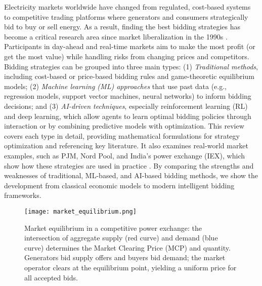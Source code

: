 \documentclass[conference]{IEEEtran}
\begin{document}
Electricity markets worldwide have changed from regulated, cost-based systems to competitive trading platforms where generators and consumers strategically bid to buy or sell energy. As a result, finding the best bidding strategies has become a critical research area since market liberalization in the 1990s \cite{David2000, David1993}. Participants in day-ahead and real-time markets aim to make the most profit (or get the most value) while handling risks from changing prices and competitors. Bidding strategies can be grouped into three main types: (1) \textit{Traditional methods}, including cost-based or price-based bidding rules and game-theoretic equilibrium models; (2) \textit{Machine learning (ML) approaches} that use past data (e.g., regression models, support vector machines, neural networks) to inform bidding decisions; and (3) \textit{AI-driven techniques}, especially reinforcement learning (RL) and deep learning, which allow agents to learn optimal bidding policies through interaction or by combining predictive models with optimization. This review covers each type in detail, providing mathematical formulations for strategy optimization and referencing key literature. It also examines real-world market examples, such as PJM, Nord Pool, and India's power exchange (IEX), which show how these strategies are used in practice \cite{Stoft2006, Amelin2008}. By comparing the strengths and weaknesses of traditional, ML-based, and AI-based bidding methods, we show the development from classical economic models to modern intelligent bidding frameworks.

\begin{figure}[ht]
    \centering
    \texttt{[image: market\_equilibrium.png]} 
    
    \caption{Market equilibrium in a competitive power exchange: the intersection of aggregate supply (red curve) and demand (blue curve) determines the Market Clearing Price (MCP) and quantity. Generators bid supply offers and buyers bid demand; the market operator clears at the equilibrium point, yielding a uniform price for all accepted bids.}
    \label{fig:market_equilibrium}
\end{figure}
\end{document}
